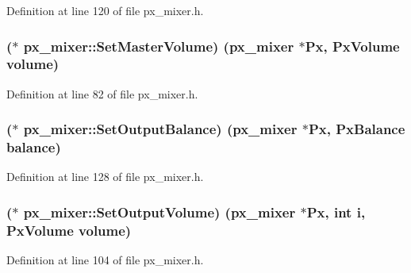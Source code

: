 Definition at line 120 of file px\+\_\+mixer.\+h.

\subsubsection[{\texorpdfstring{Set\+Master\+Volume}{SetMasterVolume}}]{($\ast$ px\+\_\+mixer\+::\+Set\+Master\+Volume) ({\bf px\+\_\+mixer} $\ast$Px, {\bf Px\+Volume} volume)}\hypertarget{structpx__mixer_aebabdea8fc84cfcfc7e90c4681343b2f}{}\label{structpx__mixer_aebabdea8fc84cfcfc7e90c4681343b2f}


Definition at line 82 of file px\+\_\+mixer.\+h.

\subsubsection[{\texorpdfstring{Set\+Output\+Balance}{SetOutputBalance}}]{($\ast$ px\+\_\+mixer\+::\+Set\+Output\+Balance) ({\bf px\+\_\+mixer} $\ast$Px, {\bf Px\+Balance} balance)}\hypertarget{structpx__mixer_a2b8fb01d96e79350014e447494e5671e}{}\label{structpx__mixer_a2b8fb01d96e79350014e447494e5671e}


Definition at line 128 of file px\+\_\+mixer.\+h.

\subsubsection[{\texorpdfstring{Set\+Output\+Volume}{SetOutputVolume}}]{($\ast$ px\+\_\+mixer\+::\+Set\+Output\+Volume) ({\bf px\+\_\+mixer} $\ast$Px, {\bf int} {\bf i}, {\bf Px\+Volume} volume)}\hypertarget{structpx__mixer_a92678c80475af8e45d9c42e4f734f7cd}{}\label{structpx__mixer_a92678c80475af8e45d9c42e4f734f7cd}


Definition at line 104 of file px\+\_\+mixer.\+h.


